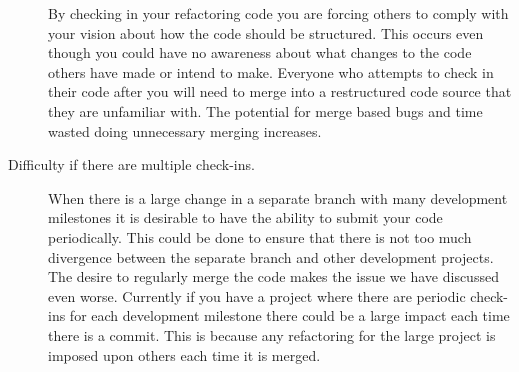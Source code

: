 \begin{description}
By checking in your refactoring code you are forcing others to comply with your vision about how the code should be structured.  This occurs even though you could have no awareness about what changes to the code others have made or intend to make.  Everyone who attempts to check in their code after you will need to merge into a restructured code source that they are unfamiliar with.  The potential for merge based bugs and time wasted doing unnecessary merging increases.

% 
% 
\item [Difficulty if there are multiple check-ins.] 
When there is a large change in a separate branch with many development milestones it is desirable to have the ability to submit your code periodically.  This could be done to ensure that there is not too much divergence between the separate branch and other development projects. The desire to regularly merge the code makes the issue we have discussed even worse. Currently if you have a project where there are periodic check-ins for each development milestone there could be a large impact each time there is a commit. This is because any refactoring for the large project is imposed upon others each time it is merged.


\end{description}
